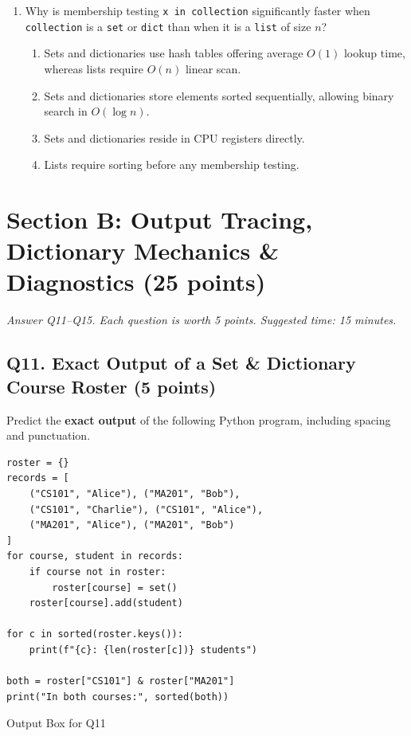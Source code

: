 \documentclass[11pt,a4paper]{article}
\begin{document}
\begin{enumerate}[label=\textbf{Q\arabic*.},leftmargin=2em,itemsep=1.5pt,topsep=1pt,resume]
\item Why is membership testing \texttt{x in collection} significantly faster when \texttt{collection} is a \texttt{set} or \texttt{dict} than when it is a \texttt{list} of size $n$?
\begin{enumerate}[label=\Alph*.,leftmargin=2em]
\item Sets and dictionaries use hash tables offering average $O(1)$ lookup time, whereas lists require $O(n)$ linear scan.
\item Sets and dictionaries store elements sorted sequentially, allowing binary search in $O(\log n)$.
\item Sets and dictionaries reside in CPU registers directly.
\item Lists require sorting before any membership testing.
\end{enumerate}
\end{enumerate}
\section*{Section B: Output Tracing, Dictionary Mechanics \& Diagnostics \hfill \normalsize\normalfont(25 points)}
\textit{Answer Q11--Q15. Each question is worth 5 points. Suggested time: 15 minutes.}
\subsection*{Q11. Exact Output of a Set \& Dictionary Course Roster (5 points)}
Predict the \textbf{exact output} of the following Python program, including spacing and punctuation.
\begin{lstlisting}
roster = {}
records = [
    ("CS101", "Alice"), ("MA201", "Bob"),
    ("CS101", "Charlie"), ("CS101", "Alice"),
    ("MA201", "Alice"), ("MA201", "Bob")
]
for course, student in records:
    if course not in roster:
        roster[course] = set()
    roster[course].add(student)

for c in sorted(roster.keys()):
    print(f"{c}: {len(roster[c])} students")

both = roster["CS101"] & roster["MA201"]
print("In both courses:", sorted(both))
\end{lstlisting}
\begin{answerbox}[height=3.1cm]{Output Box for Q11}\end{answerbox}
\newpage
\end{document}
